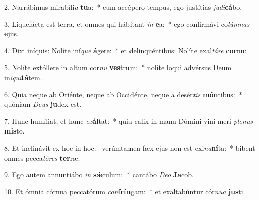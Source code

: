 2. Narrábimus mirabíli\textit{a} \textbf{tu}a:~*  cum accépero tempus, ego justítias \textit{ju}\textit{di}\textbf{cá}bo.\

3. Liquefácta est terra, et omnes qui hábitant \textit{in} \textbf{e}a:~*  ego confirmávi co\textit{lúm}\textit{nas} \textbf{e}jus.\

4. Dixi iníquis: Nolíte iní\textit{que} \textbf{á}gere:~*  et delinquéntibus: Nolíte exal\textit{tá}\textit{re} \textbf{cor}nu:\

5. Nolíte extóllere in altum cor\textit{nu} \textbf{ves}trum:~*  nolíte loqui advérsus Deum in\textit{i}\textit{qui}\textbf{tá}tem.\

6. Quia neque ab Oriénte, neque ab Occidénte, neque a desér\textit{tis} \textbf{món}tibus:~*  quóniam \textit{De}\textit{us} \textbf{ju}dex est.\

7. Hunc humíliat, et hunc \textit{ex}\textbf{ál}tat:~*  quia calix in manu Dómini vini meri \textit{ple}\textit{nus} \textbf{mis}to.\

8. Et inclinávit ex hoc in hoc: \dag\  verúmtamen fæx ejus non est exi\textit{na}\textbf{ní}ta:~*  bibent omnes pecca\textit{tó}\textit{res} \textbf{ter}ræ.\

9. Ego autem annuntiábo \textit{in} \textbf{sǽ}culum:~*  cantábo \textit{De}\textit{o} \textbf{Ja}cob.\

10. Et ómnia córnua peccatórum \textit{con}\textbf{frín}gam:~*  et exaltabúntur cór\textit{nu}\textit{a} \textbf{jus}ti.\

